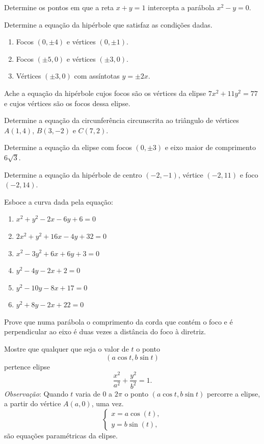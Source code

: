  \item Determine os pontos em que a reta $x+y=1$ intercepta a parábola $x^2-y=0$.
  
 \item Determine a equação da hipérbole que satisfaz as condições dadas.
  
 \begin{enumerate}[leftmargin=*]
   \item Focos $(0,\pm 4)$ e vértices $(0,\pm 1).$
   \item Focos $(\pm 5, 0)$ e vértices $(\pm 3, 0).$
   \item Vértices $(\pm 3, 0)$ com assíntotas $y=\pm 2x.$
 \end{enumerate}
 \item Ache a equação da hipérbole cujos focos são os vértices da elipse $7x^2+11y^2=77$ e cujos vértices são os focos dessa elipse.
   
\item Determine a equação da circunferência circunscrita ao triângulo de vértices $A(1,4)$, $B(3,-2)$ e $C(7,2).$
 
\item Determine a equação da elipse com focos $(0,\pm 3)$ e eixo maior de comprimento $6\sqrt{3}$. 
  
  
\item Determine a equação da hipérbole de centro $(-2,-1)$, vértice $(-2,11)$ e foco $(-2,14)$.
\item Esboce a curva dada pela equação:
  \begin{multicols}{02}
\begin{enumerate}[leftmargin=*]
   \item $x^2+y^2-2x-6y+6=0$
   \item $2x^2 + y^2 + 16x - 4y +32=0$
   \item $x^2-3y^2+6x + 6y + 3=0$
   \item $y^2-4y-2x+2=0$
   \item $y^2-10y-8x+17=0$
   \item $y^2+8y-2x+22=0$
   \end{enumerate}
\end{multicols}
  \item
 Prove que numa parábola o comprimento da corda que contém o foco e é perpendicular ao eixo \'e duas vezes a dist\^ancia do foco \`a diretriz.
 \item
 Mostre que qualquer que seja o valor de $t$ o ponto
$$(a \cos t, b \sin t )$$
pertence elipse
$$\frac{x^2}{a^2}+\frac{y^2}{b^2}=1.$$
\textit{Observação}: Quando $t$ varia de $0$ a $2\pi$ o ponto $(a \cos t,b \sin t)$ percorre a elipse, a partir do vértice
$A(a, 0)$, uma vez.
$$
\begin{cases}
x=a\cos(t),\\
y=b\sin(t),
\end{cases}
$$
s\~ao equações paramétricas da elipse.
